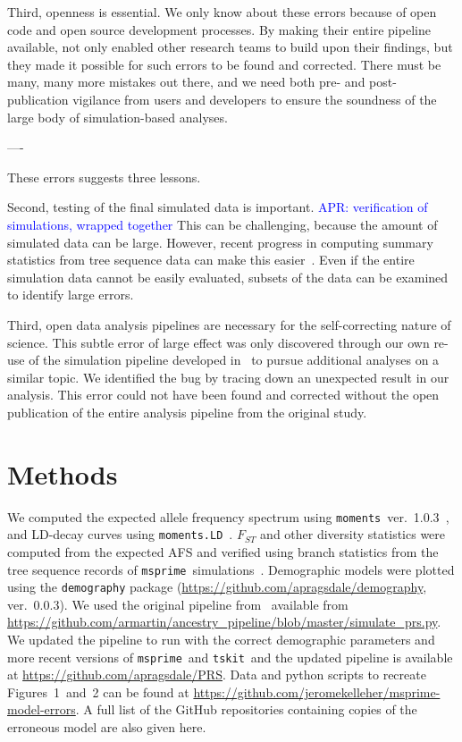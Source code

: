 \documentclass{article}
\newcommand{\msprime}[0]{\texttt{msprime}}
\newcommand{\tskit}[0]{\texttt{tskit}}
\newcommand{\aprcomment}[1]{{\textcolor{blue}{APR: #1}}}
\begin{document}
Third, openness is essential. We only know about these errors because of open code and
open source development processes. By making their entire pipeline available,
\citet{martin2017human} not only enabled other research teams to build upon their findings,
but they made it possible for such errors to be found and corrected.
There must be many, many more mistakes out there, and we need both
pre- and post-publication vigilance from users and developers to ensure the
soundness of the large body of simulation-based analyses.

----

These errors suggests three lessons.

Second, testing of the final simulated data is important. \aprcomment{verification of simulations, wrapped together}
This can be challenging, because the amount of simulated data can be large.
However, recent progress in computing summary statistics from tree
sequence data can make this easier~\citep{ralph2020efficiently}.
Even if the entire simulation data cannot be easily evaluated, subsets of the data
can be examined to identify large errors.

Third, open data analysis pipelines are necessary for the self-correcting nature of science.
This subtle error of large effect was only discovered through our own re-use of
the simulation pipeline developed in~\citet{martin2017human} to pursue
additional analyses on a similar topic. We identified the bug by tracing down an unexpected
result in our analysis. This error could not have been found and corrected without the open
publication of the entire analysis pipeline from the original study.



\section{Methods}


We computed the expected allele frequency spectrum using
\texttt{moments}~ver.~1.0.3~\citep{jouganous2017inferring}, and LD-decay curves using
\texttt{moments.LD}~\citep{ragsdale2019models}. $F_{ST}$ and other diversity statistics
were computed from the expected AFS and verified using branch statistics from the
tree sequence records of \msprime\ simulations~\citep{ralph2020efficiently}.
Demographic models were plotted using the \texttt{demography} package
(\url{https://github.com/apragsdale/demography}, ver.~0.0.3).
We used the original pipeline from~\citet{martin2017human} available from
\url{https://github.com/armartin/ancestry_pipeline/blob/master/simulate_prs.py}.
We updated the pipeline to run with the correct demographic parameters and more
recent versions of \msprime\ and \tskit\, and the updated pipeline is
available at \url{https://github.com/apragsdale/PRS}.
Data and python scripts to recreate Figures~1~and~2 can be found at
\url{https://github.com/jeromekelleher/msprime-model-errors}.
A full list of the GitHub repositories containing copies of the erroneous
model are also given here.
\end{document}
